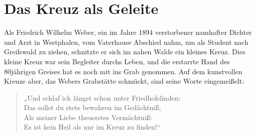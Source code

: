 \chapter{Das Kreuz als Geleite}

Als Friedrich Wilhelm Weber, ein im Jahre 1894 verstorbener namhafter Dichter und Arzt in Westphalen, vom Vaterhause Abschied nahm, um als Student nach Greifswald zu ziehen, schnitzte er sich im nahen Walde ein kleines Kreuz. Dies kleine Kreuz war sein Begleiter durchs Leben, und die erstarrte Hand des 80jährigen Greises hat es noch mit ins Grab genommen. Auf dem kunstvollen Kreuze aber, das Webers Grabstätte schmückt, sind seine Worte eingemeißelt:

\begin{verse}
„Und schlaf ich längst schon unter Friedhofslinden:\\
Das sollst du stets bewahren im Gedächtniß,\\
Als meiner Liebe theuerstes Vermächtniß:\\
Es ist kein Heil als nur im Kreuz zu finden!“
\end{verse}
